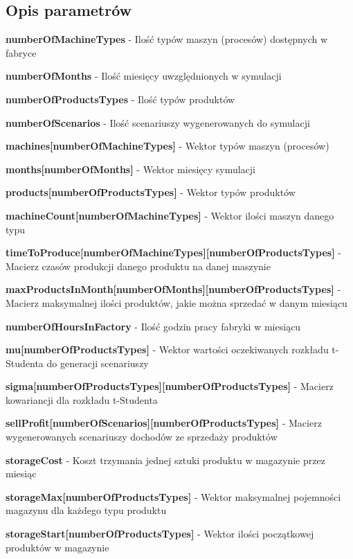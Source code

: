\subsection{Opis parametrów}

\textbf{numberOfMachineTypes} - Ilość typów maszyn (procesów) dostępnych w fabryce

\textbf{numberOfMonths} - Ilość miesięcy uwzględnionych w symulacji

\textbf{numberOfProductsTypes} - Ilość typów produktów

\textbf{numberOfScenarios} - Ilość scenariuszy wygenerowanych do symulacji

\textbf{machines[numberOfMachineTypes]} - Wektor typów maszyn (procesów)

\textbf{months[numberOfMonths]} - Wektor miesięcy symulacji

\textbf{products[numberOfProductsTypes]} - Wektor typów produktów

\textbf{machineCount[numberOfMachineTypes]} - Wektor ilości maszyn danego typu

\textbf{timeToProduce[numberOfMachineTypes][numberOfProductsTypes]} - Macierz czasów produkcji danego produktu na danej maszynie

\textbf{maxProductsInMonth[numberOfMonths][numberOfProductsTypes]} - Macierz maksymalnej ilości produktów, jakie można sprzedać w danym miesiącu

\textbf{numberOfHoursInFactory} - Ilość godzin pracy fabryki w miesiącu

\textbf{mu[numberOfProductsTypes]} - Wektor wartości oczekiwanych rozkładu t-Studenta do generacji scenariuszy

\textbf{sigma[numberOfProductsTypes][numberOfProductsTypes]} - Macierz kowariancji dla rozkładu t-Studenta

\textbf{sellProfit[numberOfScenarios][numberOfProductsTypes]} - Macierz wygenerowanych scenariuszy dochodów ze sprzedaży produktów

\textbf{storageCost} - Koszt trzymania jednej sztuki produktu w magazynie przez miesiąc

\textbf{storageMax[numberOfProductsTypes]} - Wektor maksymalnej pojemności magazynu dla każdego typu produktu

\textbf{storageStart[numberOfProductsTypes]} - Wektor ilości początkowej produktów w magazynie

